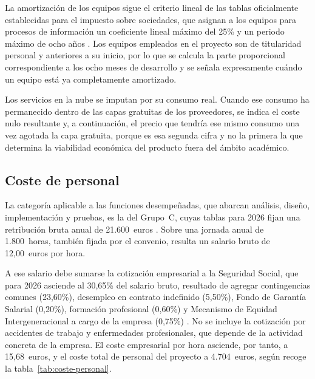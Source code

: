 La amortización de los equipos sigue el criterio lineal de las tablas oficialmente establecidas
para el impuesto sobre sociedades, que asignan a los equipos para procesos de información un coeficiente
lineal máximo del 25\% y un periodo máximo de ocho años \citep{LIS2014}. Los equipos empleados en el
proyecto son de titularidad personal y anteriores a su inicio, por lo que se calcula la parte proporcional
correspondiente a los ocho meses de desarrollo y se señala expresamente cuándo un equipo está ya
completamente amortizado.

Los servicios en la nube se imputan por su consumo real. Cuando ese consumo ha permanecido dentro
de las capas gratuitas de los proveedores, se indica el coste nulo resultante y, a continuación, el precio
que tendría ese mismo consumo una vez agotada la capa gratuita, porque es esa segunda cifra y no la primera
la que determina la viabilidad económica del producto fuera del ámbito académico.

\subsection{Coste de personal}

La categoría aplicable a las funciones desempeñadas, que abarcan análisis, diseño, implementación y
pruebas, es la del Grupo~C, cuyas tablas para 2026 fijan una retribución bruta anual de 21.600~euros
\citep{ConvenioTIC2025}. Sobre una jornada anual de 1.800~horas,
también fijada por el convenio, resulta un salario bruto de 12,00~euros por hora.

A ese salario debe sumarse la cotización empresarial a la Seguridad Social, que para 2026 asciende al
30,65\% del salario bruto, resultado de agregar contingencias comunes (23,60\%), desempleo en contrato
indefinido (5,50\%), Fondo de Garantía Salarial (0,20\%), formación profesional (0,60\%) y Mecanismo de
Equidad Intergeneracional a cargo de la empresa (0,75\%) \citep{OrdenCotizacion2026}. No se incluye la
cotización por accidentes de trabajo y enfermedades profesionales, que depende de la actividad concreta de
la empresa. El coste empresarial por hora asciende, por tanto, a 15,68~euros, y el coste total de personal
del proyecto a 4.704~euros, según recoge la tabla~\ref{tab:coste-personal}.

